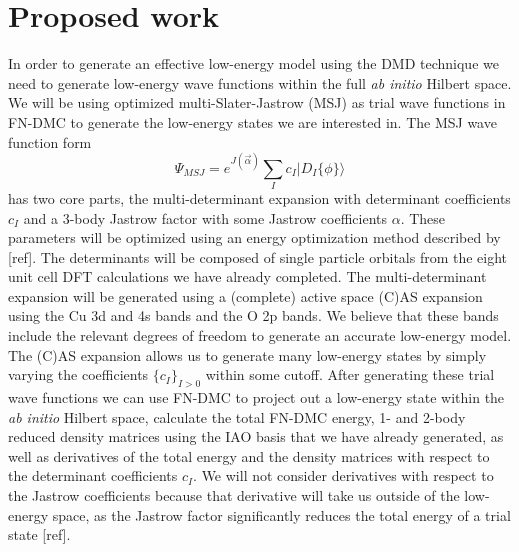 \documentclass{article}
\begin{document}
\section{Proposed work}
In order to generate an effective low-energy model using the DMD technique we need to generate low-energy wave functions within the full \textit{ab initio} Hilbert space. 
We will be using optimized multi-Slater-Jastrow (MSJ) as trial wave functions in FN-DMC to generate the low-energy states we are interested in. 
The MSJ wave function form 
\begin{equation}
\Psi_{MSJ} = e^{J(\vec{\alpha})} \sum_I c_I |D_I{\{\phi\}}\rangle 
\end{equation}
has two core parts, the multi-determinant expansion with determinant coefficients $c_I$ and a 3-body Jastrow factor with some Jastrow coefficients $\alpha$. 
These parameters will be optimized using an energy optimization method described by [ref]. 
The determinants will be composed of single particle orbitals from the eight unit cell DFT calculations we have already completed.	
The multi-determinant expansion will be generated using a (complete) active space (C)AS expansion using the Cu 3d and 4s bands and the O 2p bands. 
We believe that these bands include the relevant degrees of freedom to generate an accurate low-energy model. 
The (C)AS expansion allows us to generate many low-energy states by simply varying the coefficients $\{c_I\}_{I>0}$ within some cutoff. 
After generating these trial wave functions we can use FN-DMC to project out a low-energy state within the \textit{ab initio} Hilbert space, calculate the total FN-DMC energy, 1- and 2-body reduced density matrices using the IAO basis that we have already generated, as well as derivatives of the total energy and the density matrices with respect to the determinant coefficients $c_I$. 
We will not consider derivatives with respect to the Jastrow coefficients because that derivative will take us outside of the low-energy space, as the Jastrow factor significantly reduces the total energy of a trial state [ref]. 
\end{document}
